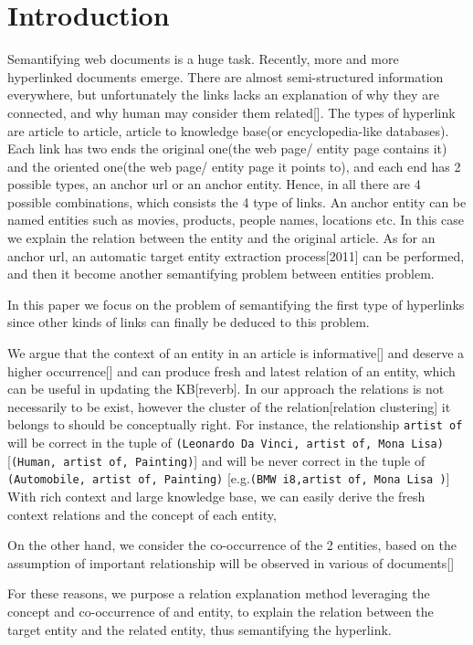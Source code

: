 \section{Introduction}


Semantifying web documents is a huge task. Recently, more and more hyperlinked documents emerge. There are almost semi-structured information everywhere, but unfortunately the links lacks an explanation of why they are connected, and why human may consider them related[]. The types of hyperlink are article to article, article to knowledge base(or encyclopedia-like databases). Each link has two ends the original one(the web page/ entity page contains it) and the oriented one(the web page/ entity page it points to), and each end has 2 possible types, an anchor url or an anchor entity. Hence, in all there are 4 possible combinations, which consists the 4 type of links.
An anchor entity can be named entities such as movies, products, people names, locations etc. In this case we explain the relation between the entity and the original article. As for an anchor url, an automatic target entity extraction process[2011] can be performed, and then it become another semantifying problem between entities problem.

In this paper we focus on the problem of semantifying the first type of hyperlinks since other kinds of links can finally be deduced to this problem.

We argue that the context of an entity in an article is informative[] and deserve a higher occurrence[] and can produce fresh and latest relation of an entity, which can be useful in updating the KB[reverb]. In our approach the relations is not necessarily to be exist, however the cluster of the relation[relation clustering] it belongs to should be conceptually right. For instance, the relationship {\tt artist of} will be correct in the tuple of {\tt(Leonardo Da Vinci, artist of, Mona Lisa)} [{\tt(Human, artist of, Painting)}] and will be never correct in the tuple of {\tt (Automobile, artist of, Painting)} [e.g.{\tt(BMW i8,artist of, Mona Lisa )}]
With rich context and large knowledge base, we can easily derive the fresh context relations and the concept of each entity, 

On the other hand, we consider the co-occurrence of the 2 entities, based on the assumption of important relationship will be observed in various of documents[]

For these reasons, we purpose a relation explanation method leveraging the concept and co-occurrence of and entity, to explain the relation between the target entity and the related entity, thus semantifying the hyperlink.
